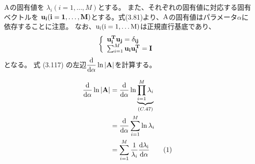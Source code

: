 \documentclass{jsarticle}
\begin{document}
$\rm A$の固有値を $λ_i(i=1,\ldots,M)$とする。
また、それぞれの固有値に対応する固有ベクトルを $\bf u_i(i=1,\ldots,M)$とする。式(3.81)より、$\rm A$の固有値はパラメータ$\alpha$に依存することに注意。
なお、$\rm u_i(i=1,\ldots M)$は正規直行基底であり、
\begin{align*}
    \left\{
        \begin{array}{l}
            \bf u_i^T \bf u_j = \delta_{ij} \\
            \sum_{i=1}^M \bf u_i \bf u_i^T = \bf I
        \end{array}
        \right.
\end{align*}
となる。
式 (3.117) の左辺$\dfrac{\rm d}{{\rm d}\alpha}\ln|{\bf A}|$を計算する。

\begin{align*}
    \frac{\rm d}{{\rm d}\alpha}\ln|{\bf A}|
    &=\frac{\rm d}{{\rm d}\alpha}\ln\underbrace{\prod_{i=1}^M\lambda_i}_{(C.47)}\\
    &=\frac{\rm d}{{\rm d}\alpha}\sum_{i=1}^M\ln\lambda_i\\
    &=\sum_{i=1}^M\frac{1}{\lambda_i}\frac{\rm d\lambda_i}{{\rm d}\alpha}\tag{1}
    \end{align*}
\end{document}
